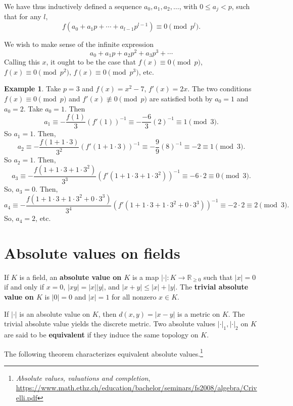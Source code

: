 \documentclass{article}
\theoremstyle{definition}
\newtheorem{example}[theorem]{Example}
\begin{document}
We have thus inductively defined a sequence $a_0,a_1,a_2,\ldots$, with $0 \leq a_j < p$, such that for any
$l$, 
\[
f(a_0+a_1p+\cdots+a_{l-1}p^{l-1}) \equiv 0 \pmod{p^l}.
\]

We wish to make sense of the infinite expression
\[
a_0+a_1p+a_2p^2+a_3p^3+\cdots
\]
Calling this $x$, it ought to be the case that $f(x) \equiv 0 \pmod{p}$, $f(x) \equiv 0 \pmod{p^2}$, $f(x) \equiv 0 \pmod{p^3}$, etc.



\begin{example}
Take $p=3$ and $f(x)=x^2-7$, $f'(x)=2x$. The two conditions $f(x) \equiv 0 \pmod{p}$ and $f'(x) \not \equiv 0 \pmod{p}$
are satisfied both by $a_0=1$ and $a_0=2$. Take $a_0=1$. Then
\[
a_1 \equiv -\frac{f(1)}{3} (f'(1))^{-1} 
\equiv
-\frac{-6}{3} (2)^{-1}
\equiv 1  \pmod{3}.
\]
So $a_1=1$. Then,
\[
a_2 \equiv -\frac{f(1+1\cdot 3)}{3^2} (f'(1+1\cdot 3))^{-1}
\equiv -\frac{9}{9}(8)^{-1} \equiv -2 \equiv 1 \pmod{3}.
\]
So $a_2=1$.
Then,
\[
a_3 \equiv -\frac{f(1+1\cdot 3+1\cdot 3^2)}{3^3} (f'(1+1\cdot 3+1\cdot 3^2))^{-1}
\equiv -6 \cdot 2 
\equiv 0 \pmod{3}.
\]
So, $a_3=0$. Then, 
\[
a_4 \equiv -\frac{f(1+1\cdot 3+1\cdot 3^2+0\cdot 3^3)}{3^4}(f'(1+1\cdot 3+1\cdot 3^2+0\cdot 3^3))^{-1}
\equiv -2 \cdot 2 \equiv 2 \pmod{3}.
\]
So, $a_4=2$, etc.
\end{example}


\section{Absolute values on fields}
If $K$ is a field, an \textbf{absolute value on $K$} is a map $|\cdot|:K \to \mathbb{R}_{\geq 0}$ such that
$|x|=0$ if and only if $x=0$, $|xy|=|x||y|$, and $|x+y| \leq |x|+|y|$. The \textbf{trivial absolute value on $K$}
is $|0|=0$ and $|x|=1$ for all nonzero $x \in K$. 

If $|\cdot|$ is an absolute value on $K$, then $d(x,y)=|x-y|$ is a metric on $K$. The trivial absolute value yields the discrete
metric. 
Two absolute values $|\cdot|_1,|\cdot|_2$ on $K$ are said to be \textbf{equivalent} if 
they induce the same topology on $K$. 

The following theorem characterizes equivalent absolute values.\footnote{{\em Absolute values, valuations and completion}, \url{https://www.math.ethz.ch/education/bachelor/seminars/fs2008/algebra/Crivelli.pdf}}
\end{document}
